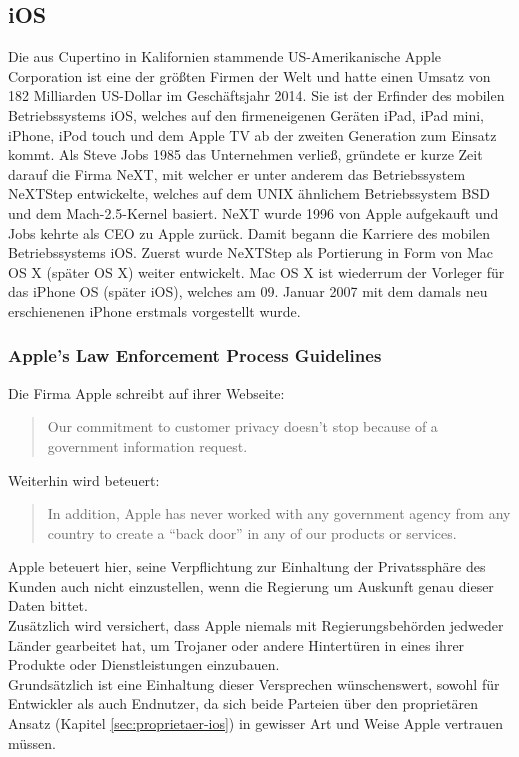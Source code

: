 \subsection{iOS}
	Die aus Cupertino in Kalifornien stammende US-Amerikanische Apple Corporation
	ist eine der größten Firmen der Welt und hatte einen Umsatz von 182 Milliarden
	US-Dollar im Geschäftsjahr 2014. Sie ist der Erfinder des mobilen
	Betriebssystems iOS, welches auf den firmeneigenen Geräten iPad, iPad mini,
	iPhone, iPod touch und dem Apple TV ab der zweiten Generation zum Einsatz
	kommt. Als Steve Jobs 1985 das Unternehmen verließ, gründete er
	kurze Zeit darauf die Firma NeXT, mit welcher er unter anderem das
	Betriebssystem NeXTStep entwickelte, welches auf dem UNIX ähnlichem
	Betriebssystem BSD\cite[S.12]{Tanenbaum2009} und dem Mach-2.5-Kernel
	\cite{MachProject2015} basiert. NeXT wurde 1996 von Apple aufgekauft und Jobs
	kehrte als CEO zu Apple zurück. Damit begann die Karriere des mobilen
	Betriebssystems iOS. Zuerst wurde NeXTStep als Portierung in Form von Mac OS X
	(später OS X) weiter entwickelt. Mac OS X ist wiederrum der Vorleger für das
	iPhone OS (später iOS), welches am 09. Januar 2007 mit dem damals neu
	erschienenen iPhone erstmals vorgestellt wurde.
	
	\subsubsection{Apple's Law Enforcement Process Guidelines}
		Die Firma Apple schreibt auf ihrer Webseite:
		\begin{quote}
			Our commitment to customer privacy doesn't stop because of a government
			information request.\cite{AppleGovInfo2015}
		\end{quote}
		Weiterhin wird beteuert:
		\begin{quote}
			In addition, Apple has never worked with any government agency from any
			country to create a "`back door"' in any of our products or
			services.\cite{AppleGovInfo2015}
		\end{quote}
		Apple beteuert hier, seine Verpflichtung zur Einhaltung der Privatssphäre des
		Kunden auch nicht einzustellen, wenn die Regierung um Auskunft genau dieser
		Daten bittet.\\
		Zusätzlich wird versichert, dass Apple niemals mit Regierungsbehörden
		jedweder Länder gearbeitet hat, um Trojaner oder andere Hintertüren in eines
		ihrer Produkte oder Dienstleistungen einzubauen.\\
		Grundsätzlich ist eine Einhaltung dieser Versprechen wünschenswert, sowohl für
		Entwickler als auch Endnutzer, da sich beide Parteien über den proprietären
		Ansatz (Kapitel \ref{sec:proprietaer-ios}) in gewisser Art und Weise Apple
		vertrauen müssen.
